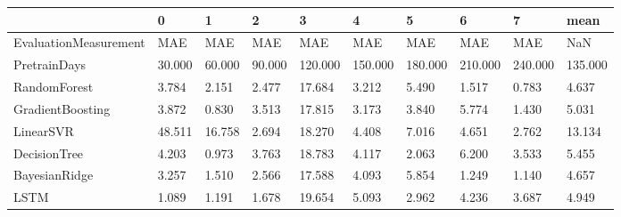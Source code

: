 \begin{tabular}{llllllllll}
\toprule
{} &      0 &      1 &      2 &       3 &       4 &       5 &       6 &       7 &    mean \\
\midrule
EvaluationMeasurement &    MAE &    MAE &    MAE &     MAE &     MAE &     MAE &     MAE &     MAE &     NaN \\
PretrainDays          & 30.000 & 60.000 & 90.000 & 120.000 & 150.000 & 180.000 & 210.000 & 240.000 & 135.000 \\
RandomForest          &  3.784 &  2.151 &  2.477 &  17.684 &   3.212 &   5.490 &   1.517 &   0.783 &   4.637 \\
GradientBoosting      &  3.872 &  0.830 &  3.513 &  17.815 &   3.173 &   3.840 &   5.774 &   1.430 &   5.031 \\
LinearSVR             & 48.511 & 16.758 &  2.694 &  18.270 &   4.408 &   7.016 &   4.651 &   2.762 &  13.134 \\
DecisionTree          &  4.203 &  0.973 &  3.763 &  18.783 &   4.117 &   2.063 &   6.200 &   3.533 &   5.455 \\
BayesianRidge         &  3.257 &  1.510 &  2.566 &  17.588 &   4.093 &   5.854 &   1.249 &   1.140 &   4.657 \\
LSTM                  &  1.089 &  1.191 &  1.678 &  19.654 &   5.093 &   2.962 &   4.236 &   3.687 &   4.949 \\
\bottomrule
\end{tabular}
